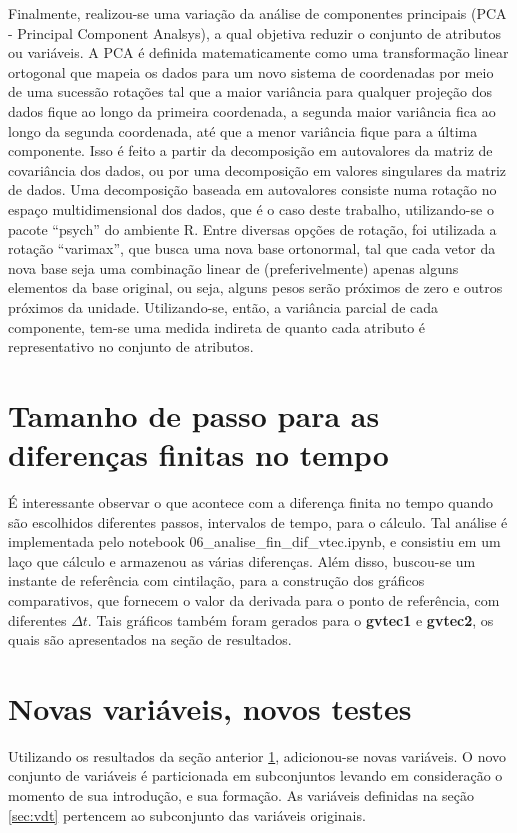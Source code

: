 Finalmente, realizou-se uma variação da análise de componentes principais (PCA - Principal Component Analsys), a qual objetiva reduzir o conjunto de atributos ou variáveis. A PCA é definida matematicamente como uma transformação linear ortogonal que mapeia os dados para um novo sistema de coordenadas por meio de uma sucessão rotações tal que a maior variância para qualquer projeção dos dados fique ao longo da primeira coordenada, a segunda maior variância fica ao longo da segunda coordenada, até que a menor variância fique para a última componente. Isso é feito a partir da decomposição em autovalores da matriz de covariância dos dados, ou por uma decomposição em valores singulares da matriz de dados. Uma decomposição baseada em autovalores consiste numa rotação no espaço multidimensional dos dados, que é o caso deste trabalho, utilizando-se o pacote ``psych'' do ambiente R. Entre diversas opções de rotação, foi utilizada a rotação ``varimax'', que busca uma nova base ortonormal, tal que cada vetor da nova base seja uma combinação linear de (preferivelmente) apenas alguns elementos da base original, ou seja, alguns pesos serão próximos de zero e outros próximos da unidade. Utilizando-se, então, a variância parcial de cada componente, tem-se uma medida indireta de quanto cada atributo é representativo no conjunto de atributos.

\section{Tamanho de passo para as diferenças finitas no tempo}\label{sec:tpdft}

É interessante observar o que acontece com a diferença finita no tempo quando são escolhidos diferentes passos, intervalos de tempo, para o cálculo. Tal análise é implementada pelo notebook 06\_analise\_fin\_dif\_vtec.ipynb, e consistiu em um laço que cálculo e armazenou as várias diferenças. Além disso, buscou-se um instante de referência com cintilação, para a construção dos gráficos comparativos, que fornecem o valor da derivada para o ponto de referência, com diferentes $\Delta{t}$. Tais gráficos também foram gerados para o {\bf gvtec1} e {\bf gvtec2}, os quais são apresentados na seção de resultados.

\section{Novas variáveis, novos testes}\label{sec:nvnt}

Utilizando os resultados da seção anterior \ref{sec:tpdft}, adicionou-se novas variáveis. O novo conjunto de variáveis é particionada em subconjuntos levando em consideração o momento de sua introdução, e sua formação. As variáveis definidas na seção \ref{sec:vdt} pertencem ao subconjunto das variáveis originais.

